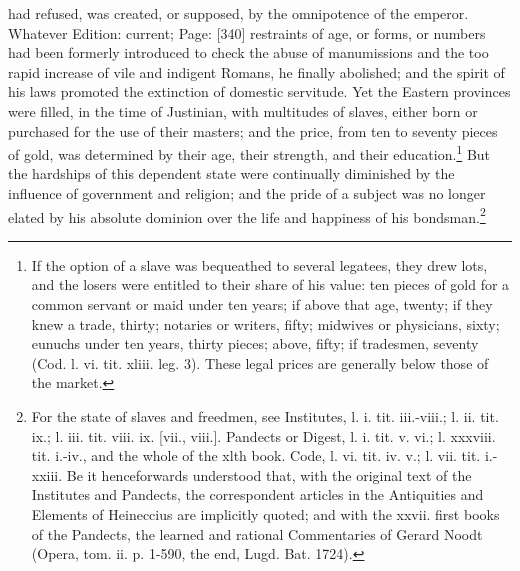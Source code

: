 had refused, was created, or supposed, by the omnipotence of the emperor. Whatever Edition: current; Page: [340] restraints of age, or forms, or numbers had been formerly introduced to check the abuse of manumissions and the too rapid increase of vile and indigent Romans, he finally abolished; and the spirit of his laws promoted the extinction of domestic servitude. Yet the Eastern provinces were filled, in the time of Justinian, with multitudes of slaves, either born or purchased for the use of their masters; and the price, from ten to seventy pieces of gold, was determined by their age, their strength, and their education.\footnote{If the option of a slave was bequeathed to several legatees, they drew lots, and the losers were entitled to their share of his value: ten pieces of gold for a common servant or maid under ten years; if above that age, twenty; if they knew a trade, thirty; notaries or writers, fifty; midwives or physicians, sixty; eunuchs under ten years, thirty pieces; above, fifty; if tradesmen, seventy (Cod. l. vi. tit. xliii. leg. 3). These legal prices are generally below those of the market.} But the hardships of this dependent state were continually diminished by the influence of government and religion; and the pride of a subject was no longer elated by his absolute dominion over the life and happiness of his bondsman.\footnote{For the state of slaves and freedmen, see Institutes, l. i. tit. iii.-viii.; l. ii. tit. ix.; l. iii. tit. viii. ix. [vii., viii.]. Pandects or Digest, l. i. tit. v. vi.; l. xxxviii. tit. i.-iv., and the whole of the xlth book. Code, l. vi. tit. iv. v.; l. vii. tit. i.-xxiii. Be it henceforwards understood that, with the original text of the Institutes and Pandects, the correspondent articles in the Antiquities and Elements of Heineccius are implicitly quoted; and with the xxvii. first books of the Pandects, the learned and rational Commentaries of Gerard Noodt (Opera, tom. ii. p. 1-590, the end, Lugd. Bat. 1724).}


